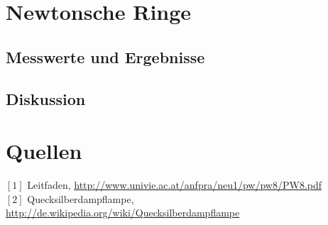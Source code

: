 \documentclass[12pt,a4paper]{article}
\begin{document}
\begin{multicols}{2}
\section{Newtonsche Ringe}


\subsection{Messwerte und Ergebnisse}



\subsection{Diskussion}

\section{Quellen}
$[1]$ Leitfaden, \url{http://www.univie.ac.at/anfpra/neu1/pw/pw8/PW8.pdf}\\
$[2]$ Quecksilberdampflampe, \url{http://de.wikipedia.org/wiki/Quecksilberdampflampe}\\

\end{multicols}
\end{document}
